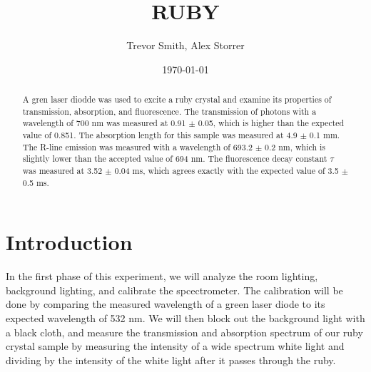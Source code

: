 \documentclass[aps,prl,reprint]{revtex4-2}
\begin{document}

\title{RUBY}


\author{Trevor Smith, Alex Storrer}


\date{\today}

\begin{abstract}
	A gren laser diodde was used to excite a ruby crystal and examine its properties
	of transmission, absorption, and fluorescence. The transmission of photons with
	a wavelength of 700 nm was measured at 0.91 $\pm$ 0.05, which is higher than
	the expected value of 0.851. The absorption length for this sample was measured
	at 4.9 $\pm$ 0.1 mm. The R-line emission was measured with a wavelength of 
	693.2 $\pm$ 0.2 nm, which is slightly lower than the accepted value of 694 nm.
	The fluorescence decay constant $\tau$ was measured at 3.52 $\pm$ 0.04 ms, which
	agrees exactly with the expected value of 3.5 $\pm$ 0.5 ms.
\end{abstract}


\maketitle

\section{Introduction}
In the first phase of this experiment, we will analyze the room lighting, background 
lighting, and calibrate the spcectrometer. The calibration will be done by comparing
the measured wavelength of a green laser diode to its expected wavelength of 532 nm. 
We will then block out the background light with a black cloth, and
measure the transmission and absorption spectrum of our ruby crystal sample
by measuring the intensity of a wide spectrum white light and dividing by the 
intensity of the white light after it passes through the ruby. \\
\end{document}
